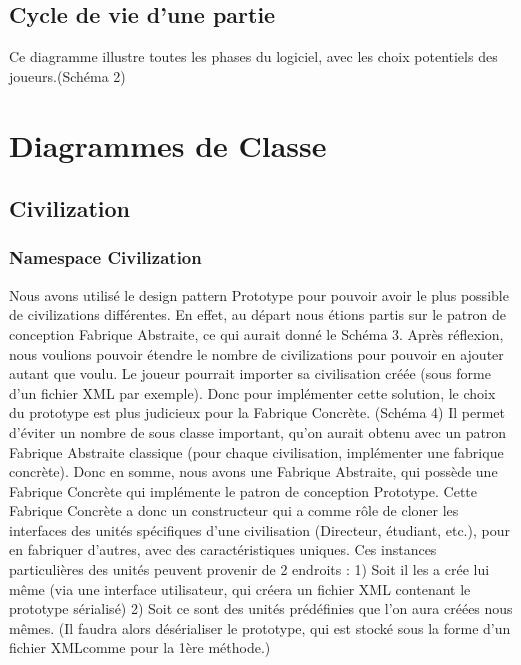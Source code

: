 	\subsection{Cycle de vie d'une partie}
	Ce diagramme illustre toutes les phases du logiciel, avec les choix potentiels des joueurs.(Schéma 2)
	
\section{Diagrammes de Classe}
	\subsection{Civilization}
		\subsubsection{Namespace Civilization}
			Nous avons utilisé le design pattern Prototype pour pouvoir avoir le plus possible de civilizations différentes.
		En effet, au départ nous étions partis sur le patron de conception Fabrique Abstraite, ce qui aurait donné le Schéma 3.
			Après réflexion, nous voulions pouvoir étendre le nombre de civilizations pour pouvoir en ajouter autant que voulu.
		Le joueur pourrait importer sa civilisation créée (sous forme d'un fichier XML par exemple). 
		Donc pour implémenter cette solution, le choix du prototype est plus judicieux pour la Fabrique Concrète. (Schéma 4)
		Il permet d'éviter un nombre de sous classe important, qu'on aurait obtenu avec un patron Fabrique Abstraite classique (pour chaque civilisation, implémenter une fabrique concrète).
			Donc en somme, nous avons une Fabrique Abstraite, qui possède une Fabrique Concrète qui implémente le patron de conception Prototype.
			Cette Fabrique Concrète a donc un constructeur qui a comme rôle de cloner les interfaces des unités spécifiques d'une civilisation (Directeur, étudiant, etc.),
		pour en fabriquer d'autres, avec des caractéristiques uniques.
			Ces instances particulières des unités peuvent provenir de 2 endroits :
				1) Soit il les a crée lui même (via une interface utilisateur, qui créera un fichier XML contenant le prototype sérialisé)
				2) Soit ce sont des unités prédéfinies que l'on aura créées nous mêmes. (Il faudra alors désérialiser le prototype, qui est stocké sous la forme d'un fichier XMLcomme pour la 1ère méthode.)
		
